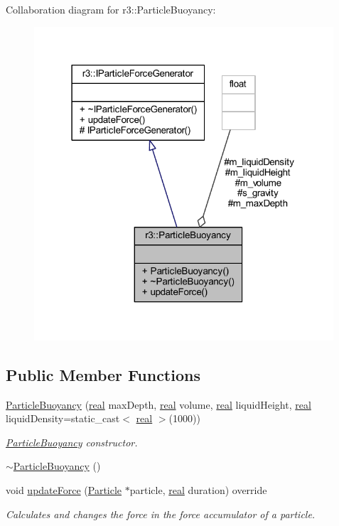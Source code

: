 Collaboration diagram for r3\+:\+:Particle\+Buoyancy\+:\nopagebreak
\begin{figure}[H]
\begin{center}
\leavevmode
\includegraphics[width=316pt]{classr3_1_1_particle_buoyancy__coll__graph}
\end{center}
\end{figure}
\subsection*{Public Member Functions}
\begin{DoxyCompactItemize}
\item 
\mbox{\hyperlink{classr3_1_1_particle_buoyancy_ae47508b0082fd01797764cd3c85d67e7}{Particle\+Buoyancy}} (\mbox{\hyperlink{namespacer3_ab2016b3e3f743fb735afce242f0dc1eb}{real}} max\+Depth, \mbox{\hyperlink{namespacer3_ab2016b3e3f743fb735afce242f0dc1eb}{real}} volume, \mbox{\hyperlink{namespacer3_ab2016b3e3f743fb735afce242f0dc1eb}{real}} liquid\+Height, \mbox{\hyperlink{namespacer3_ab2016b3e3f743fb735afce242f0dc1eb}{real}} liquid\+Density=static\+\_\+cast$<$ \mbox{\hyperlink{namespacer3_ab2016b3e3f743fb735afce242f0dc1eb}{real}} $>$(1000))
\begin{DoxyCompactList}\small\item\em \mbox{\hyperlink{classr3_1_1_particle_buoyancy}{Particle\+Buoyancy}} constructor. \end{DoxyCompactList}\item 
\mbox{\hyperlink{classr3_1_1_particle_buoyancy_a9ebaf421f758cf01ce164f679cb5c4c0}{$\sim$\+Particle\+Buoyancy}} ()
\item 
void \mbox{\hyperlink{classr3_1_1_particle_buoyancy_ad1249e51508770fd9b1775c8e22eb51a}{update\+Force}} (\mbox{\hyperlink{classr3_1_1_particle}{Particle}} $\ast$particle, \mbox{\hyperlink{namespacer3_ab2016b3e3f743fb735afce242f0dc1eb}{real}} duration) override
\begin{DoxyCompactList}\small\item\em Calculates and changes the force in the force accumulator of a particle. \end{DoxyCompactList}\end{DoxyCompactItemize}

